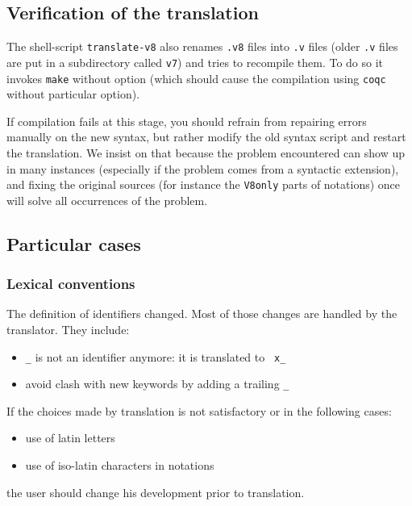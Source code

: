 \documentclass[11pt,a4paper]{article}
\begin{document}
\subsection{Verification of the translation}

The shell-script {\tt translate-v8} also renames {\tt .v8} files into
{\tt .v} files (older {\tt .v} files are put in a subdirectory called
{\tt v7}) and tries to recompile them. To do so it invokes {\tt make}
without option (which should cause the compilation using {\tt coqc}
without particular option).

If compilation fails at this stage, you should refrain from repairing
errors manually on the new syntax, but rather modify the old syntax
script and restart the translation. We insist on that because the
problem encountered can show up in many instances (especially if the
problem comes from a syntactic extension), and fixing the original
sources (for instance the {\tt V8only} parts of notations) once will
solve all occurrences of the problem.


\subsection{Particular cases}

\subsubsection{Lexical conventions}

The definition of identifiers changed. Most of those changes are
handled by the translator. They include:
\begin{itemize}
\item {\tt \_} is not an identifier anymore: it is translated to {\tt
x\_}
\item avoid clash with new keywords by adding a trailing {\tt \_}
\end{itemize}

If the choices made by translation is not satisfactory 
or in the following cases:
\begin{itemize}
\item use of latin letters
\item use of iso-latin characters in notations
\end{itemize}
the user should change his development prior to translation.
\end{document}
